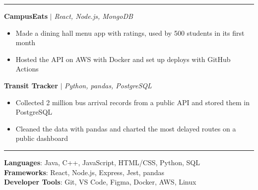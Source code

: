 \documentclass[letterpaper,11pt]{article}
\renewcommand{\section}[1]{\vspace{5pt}{\large\scshape #1}\par\vspace{-3pt}\rule{\textwidth}{0.4pt}\par\vspace{2pt}}
\newcommand{\resumeItem}[1]{\item\small{#1}}
\newcommand{\resumeSubHeadingListStart}{\begin{list}{}{\setlength{\leftmargin}{0.15in}\setlength{\itemsep}{1pt}\setlength{\topsep}{0pt}}}
\newcommand{\resumeSubHeadingListEnd}{\end{list}}
\newcommand{\resumeItemListStart}{\begin{itemize}\setlength{\itemsep}{-2pt}}
\newcommand{\resumeItemListEnd}{\end{itemize}}
\begin{document}
\section{Projects}
    \resumeSubHeadingListStart
      \item
          \textbf{CampusEats} $|$ \emph{React, Node.js, MongoDB}
          \resumeItemListStart
            \resumeItem{Made a dining hall menu app with ratings, used by 500 students in its first month}
            \resumeItem{Hosted the API on A{}WS with Docker and set up deploys with GitHub Actions}
          \resumeItemListEnd
      \item
          \textbf{T{}ransit T{}racker} $|$ \emph{Python, pandas, PostgreSQL}
          \resumeItemListStart
            \resumeItem{Collected 2 million bus arrival records from a public API and stored them in PostgreSQL}
            \resumeItem{Cleaned the data with pandas and charted the most delayed routes on a public dashboard}
          \resumeItemListEnd
    \resumeSubHeadingListEnd
\section{Technical Skills}
 \begin{list}{}{\setlength{\leftmargin}{0.15in}}
    \small{\item{
     \textbf{Languages}{: Java, C++, JavaScript, HTML/CSS, Python, SQL} \\
     \textbf{Frameworks}{: React, Node.js, Express, Jest, pandas} \\
     \textbf{Developer T{}ools}{: Git, VS Code, Figma, Docker, A{}WS, Linux}
    }}
 \end{list}
\end{document}

